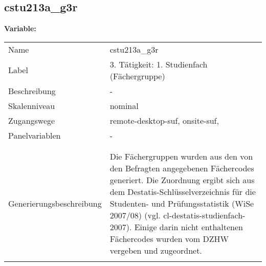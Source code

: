 	
	
	\subsection{cstu213a\_g3r}
	\label{subSection:cstu213a_g3r}

	\noindent\textbf{Variable:}\\
		\begin{tabular}{lL{11.3cm}}
			\label{tableVariable:cstu213a_g3r}
			Name & cstu213a\_g3r \\
			Label & 3. Tätigkeit: 1. Studienfach (Fächergruppe) \\
			Beschreibung & - \\
			Skalenniveau & nominal \\
			Zugangswege &
				remote-desktop-suf,
				onsite-suf,
 \\
			Panelvariablen & -
			 \\
			 \\
 \\
					Generierungsbeschreibung & Die Fächergruppen wurden aus den von den Befragten angegebenen Fächercodes generiert. Die Zuordnung ergibt sich aus dem Destatis-Schlüsselverzeichnis für die Studenten- und Prüfungsstatistik (WiSe 2007/08) (vgl. cl-destatis-studienfach-2007).  Einige darin nicht enthaltenen Fächercodes wurden vom DZHW vergeben und zugeordnet. 
				 \\	
			 \\
		\end{tabular}






